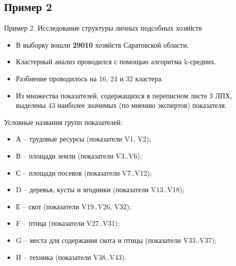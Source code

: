 \documentclass{beamer}
\begin{document}
\subsection{Пример 2}

\begin{frame}{Пример 2. Исследование структуры личных подсобных хозяйств}
\begin{itemize}
\item В выборку вошли \textbf{29010} хозяйств Саратовской области.
\item Кластерный анализ проводился с помощью алгоритма k-средних.
\item Разбиение проводилось на 16, 24 и 32 кластера. 
\item Из множества показателей, содержащихся в переписном листе 3 ЛПХ, выделены 43 наиболее значимых
(по мнению экспертов) показателя. 
\end{itemize}
Условные названия групп показателей:
\begin{itemize}
\item А – трудовые ресурсы (показатели V1, V2);
\item В – площади земли (показатели V3..V6);
\item С – площади посевов (показатели V7..V12);
\item D – деревья, кусты и ягодники (показатели V13..V18);
\item Е – скот (показатели V19..V26, V32);
\item F – птица (показатели V27..V31);
\item G – места для содержания скота и птицы (показатели V33..V37);
\item H – техника (показатели V38..V43).
\end{itemize}
\end{frame}
\end{document}

